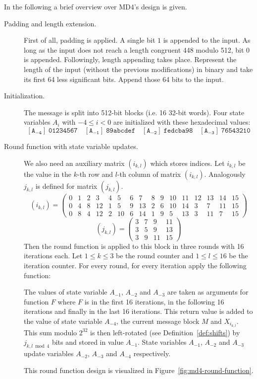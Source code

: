 In the following a brief overview over MD4's design is given.

\begin{description}
  \item[Padding and length extension.]
    First of all, padding is applied. A single bit $1$ is appended to the
    input. As long as the input does not reach a length congruent 448 modulo 512,
    bit $0$ is appended.
    Followingly, length appending takes place. Represent the length of the input
    (without the previous modifications) in binary and take its first
    64 less significant bits. Append those 64 bits to the input.
  \item[Initialization.]
    The message is split into 512-bit blocks (i.e. 16 32-bit words).
    Four state variables $A_{i}$ with $-4 \leq i < 0$ are initialized with these
    hexadecimal values:
    \[
      \mathtt{[A_{-4}]}\; \texttt{01234567} \quad
      \mathtt{[A_{-1}]}\; \texttt{89abcdef} \quad
      \mathtt{[A_{-2}]}\; \texttt{fedcba98} \quad
      \mathtt{[A_{-3}]}\; \texttt{76543210}
    \]
  \item[Round function with state variable updates.]
    We also need an auxiliary matrix $(i_{k,l})$ which stores indices.
    Let $i_{k,l}$ be the value in the $k$-th row and $l$-th column of matrix $(i_{k,l})$.
    Analogously $j_{k,l}$ is defined for matrix $(j_{k,l})$.
    \[
      (i_{k,l}) = \left(\begin{array}{cccccccccccccccc}
        0 & 1 & 2 & 3 & 4 & 5 & 6 & 7 & 8 & 9 & 10 & 11 & 12 & 13 & 14 & 15 \\
        0 & 4 & 8 & 12 & 1 & 5 & 9 & 13 & 2 & 6 & 10 & 14 & 3 & 7 & 11 & 15 \\
        0 & 8 & 4 & 12 & 2 & 10 & 6 & 14 & 1 & 9 & 5 & 13 & 3 & 11 & 7 & 15
      \end{array}\right)
    \] \[
      (j_{k,l}) = \begin{pmatrix}
        3 & 7 & 9 & 11 \\
        3 & 5 & 9 & 13 \\
        3 & 9 & 11 & 15
      \end{pmatrix}
    \]
    Then the round function is applied to this block in three rounds
    with 16 iterations each. Let $1 \leq k \leq 3$ be the round counter
    and $1 \leq l \leq 16$ be the iteration counter. For every round,
    for every iteration apply the following function:

    The values of state variable $A_{-1}$, $A_{-2}$ and $A_{-3}$ are taken as arguments
    for function $F$ where $F$ is  in the first 16 iterations,
     in the following 16 iterations and finally 
    in the last 16 iterations. This return value is added to the value of state
    variable $A_{-4}$, the current message block $M$ and $X_{i_{k,l}}$.
    This sum modulo $2^{32}$ is then left-rotated (see Definition~\ref{def:shifts}) by
    $j_{k,l \bmod{4}}$ bits and stored in value $A_{-1}$. State variables $A_{-1}$, $A_{-2}$ and
    $A_{-3}$ update variables $A_{-2}$, $A_{-3}$ and $A_{-4}$ respectively.

    This round function design is visualized in Figure~\ref{fig:md4-round-function}.
\end{description}

